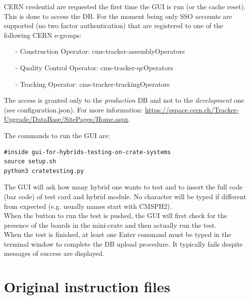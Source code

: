 \documentclass[10pt,a4paper]{article}
\begin{document}
CERN credential are requested the first time the GUI is run (or the cache reset). This is done to access the DB. For the moment being only SSO accounts are supported (no two factor authentication) that are registered to one of the following CERN e-groups:
\begin{itemize}
\item[-] Construction Operator: cms-tracker-assemblyOperators
\item[-] Quality Control Operator: cms-tracker-qcOperators
\item[-] Tracking Operator: cms-tracker-trackingOperators
\end{itemize}
The access is granted only to the {\it production} DB and not to the {\it development} one (see configuration.json). For more information:
\url{https://espace.cern.ch/Tracker-Upgrade/DataBase/SitePages/Home.aspx}.

The commands to run the GUI are:

\begin{framed}
\begin{verbatim}
#inside gui-for-hybrids-testing-on-crate-systems
source setup.sh
python3 cratetesting.py
\end{verbatim}
\end{framed}

The GUI will ask how many hybrid one wants to test and to insert the full code (bar code) of test card and hybrid module.
No character will be typed if different from expected (e.g. usually names start with CMSPH2). \\
When the button to run the test is pushed, the GUI will first check for the presence of the boards in the mini-crate and then actually run the test. \\

When the test is finished, at least one Enter command must be typed in the terminal window to complete the DB upload procedure. It typically fails despite messages of success are displayed. 

\newpage

\appendix

\appendixpage
\section{Original instruction files}


\end{document}
